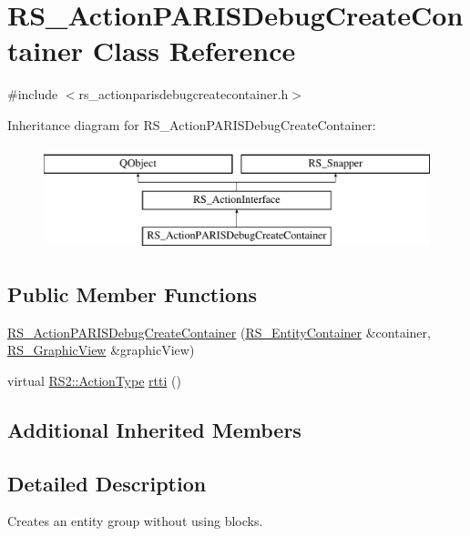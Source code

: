 \hypertarget{classRS__ActionPARISDebugCreateContainer}{\section{R\-S\-\_\-\-Action\-P\-A\-R\-I\-S\-Debug\-Create\-Container Class Reference}
\label{classRS__ActionPARISDebugCreateContainer}
}


{\ttfamily \#include $<$rs\-\_\-actionparisdebugcreatecontainer.\-h$>$}

Inheritance diagram for R\-S\-\_\-\-Action\-P\-A\-R\-I\-S\-Debug\-Create\-Container\-:\begin{figure}[H]
\begin{center}
\leavevmode
\includegraphics[height=3.000000cm]{classRS__ActionPARISDebugCreateContainer}
\end{center}
\end{figure}
\subsection*{Public Member Functions}
\begin{DoxyCompactItemize}
\item 
\hyperlink{classRS__ActionPARISDebugCreateContainer_a58062215dca1366dfebe7a448a8f95e6}{R\-S\-\_\-\-Action\-P\-A\-R\-I\-S\-Debug\-Create\-Container} (\hyperlink{classRS__EntityContainer}{R\-S\-\_\-\-Entity\-Container} \&container, \hyperlink{classRS__GraphicView}{R\-S\-\_\-\-Graphic\-View} \&graphic\-View)
\item 
virtual \hyperlink{classRS2_afe3523e0bc41fd637b892321cfc4b9d7}{R\-S2\-::\-Action\-Type} \hyperlink{classRS__ActionPARISDebugCreateContainer_a167366ac441baed4bf65446d97b3a3a3}{rtti} ()
\end{DoxyCompactItemize}
\subsection*{Additional Inherited Members}


\subsection{Detailed Description}
Creates an entity group without using blocks.

